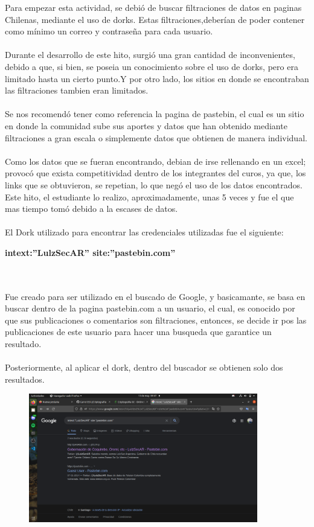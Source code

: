 \documentclass[]{article}
\begin{document}
    Para empezar esta actividad, se debió de buscar filtraciones de datos en paginas Chilenas, mediante el uso de dorks.
     Estas filtraciones,deberían de poder contener como mínimo un correo y contraseña para cada usuario.      
    \\\\
    Durante el desarrollo de este hito, surgió una gran cantidad de inconvenientes, debido a que, si bien, se poseia un conocimiento
    sobre el uso de dorks, pero era limitado hasta un cierto punto.Y por otro lado, los sitios en donde se encontraban las filtraciones
    tambien eran limitados.
    \\\\
    Se nos recomendó tener como referencia la pagina de pastebin, el cual es un sitio en donde la comunidad sube sus aportes y datos que han
    obtenido mediante filtraciones a gran escala o simplemente datos que obtienen de manera individual.
    \\\\
    Como los datos que se fueran encontrando, debian de irse rellenando en un excel; provocó que exista competitividad dentro de los 
    integrantes del curos, ya que, los links que se obtuvieron, se repetian, lo que negó el uso de los datos encontrados. Este hito,
    el estudiante lo realizo, aproximadamente, unas 5 veces y fue el que mas tiempo tomó debido a la escases de datos. 
    \\\\
    El Dork utilizado para encontrar las credenciales utilizadas fue el siguiente:
    \\
    \begin{center}
        \textbf{intext:''LulzSecAR'' site:''pastebin.com''}
    \end{center}
    \\\\
    Fue creado para ser utilizado en el buscado de Google, y basicamante, se basa en buscar dentro de la pagina pastebin.com a un usuario, el cual, es conocido por que sus publicaciones o
    comentarios son filtraciones, entonces, se decide ir pos las publicaciones de este usuario para hacer una busqueda que garantice
    un resultado. 
    \\\\
    Posteriormente, al aplicar el dork, dentro del buscador se obtienen solo dos resultados.
    \begin{figure}[h!]
        \centering
        \includegraphics[width=10cm ]{respuestadork.png}
    \end{figure}
\end{document}
